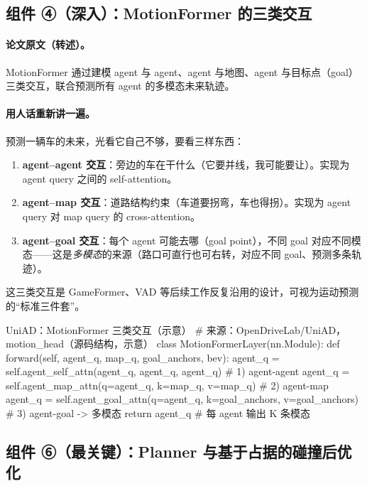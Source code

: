 \subsection{组件 ④（深入）：MotionFormer 的三类交互}
\label{sec:de-motionformer}

\paragraph{论文原文（转述）。}
MotionFormer 通过建模 agent 与 agent、agent 与地图、agent 与目标点（goal）三类交互，联合预测所有 agent 的多模态未来轨迹\cite{hu2023uniad}。

\paragraph{用人话重新讲一遍。}
预测一辆车的未来，光看它自己不够，要看三样东西：
\begin{enumerate}
  \item \textbf{agent--agent 交互}：旁边的车在干什么（它要并线，我可能要让）。实现为 agent query 之间的 self-attention。
  \item \textbf{agent--map 交互}：道路结构约束（车道要拐弯，车也得拐）。实现为 agent query 对 map query 的 cross-attention。
  \item \textbf{agent--goal 交互}：每个 agent 可能去哪（goal point），不同 goal 对应不同模态——这是\emph{多模态}的来源（路口可直行也可右转，对应不同 goal、预测多条轨迹）。
\end{enumerate}
这三类交互是 GameFormer、VAD 等后续工作反复沿用的设计，可视为运动预测的“标准三件套”。

\begin{codebox}[Python]{UniAD：MotionFormer 三类交互（示意）}
# 来源：OpenDriveLab/UniAD，motion_head（源码结构，示意）
class MotionFormerLayer(nn.Module):
    def forward(self, agent_q, map_q, goal_anchors, bev):
        agent_q = self.agent_self_attn(agent_q, agent_q, agent_q)        # 1) agent-agent
        agent_q = self.agent_map_attn(q=agent_q, k=map_q, v=map_q)       # 2) agent-map
        agent_q = self.agent_goal_attn(q=agent_q, k=goal_anchors,
                                       v=goal_anchors)                   # 3) agent-goal -> 多模态
        return agent_q                                                   # 每 agent 输出 K 条模态
\end{codebox}

\subsection{组件 ⑥（最关键）：Planner 与基于占据的碰撞后优化}
\label{sec:de-collision}

